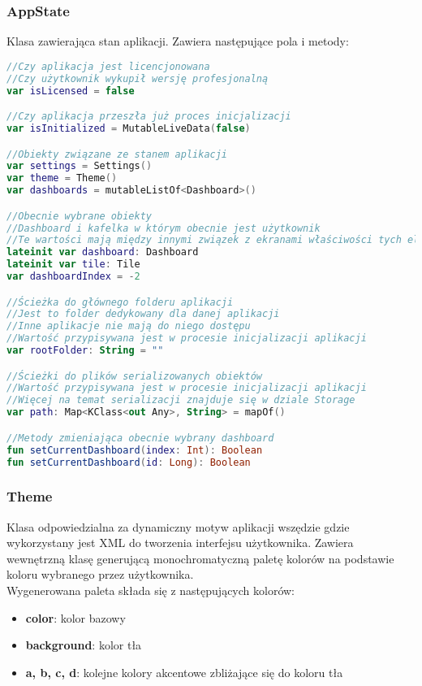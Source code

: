 \newpage

\subsubsection{AppState}
Klasa zawierająca stan aplikacji. Zawiera następujące pola i metody:

\begin{lstlisting}[language=Kotlin]
//Czy aplikacja jest licencjonowana
//Czy użytkownik wykupił wersję profesjonalną
var isLicensed = false

//Czy aplikacja przeszła już proces inicjalizacji
var isInitialized = MutableLiveData(false)

//Obiekty związane ze stanem aplikacji
var settings = Settings()
var theme = Theme()
var dashboards = mutableListOf<Dashboard>()

//Obecnie wybrane obiekty
//Dashboard i kafelka w którym obecnie jest użytkownik
//Te wartości mają między innymi związek z ekranami właściwości tych elementów
lateinit var dashboard: Dashboard
lateinit var tile: Tile
var dashboardIndex = -2

//Ścieżka do głównego folderu aplikacji
//Jest to folder dedykowany dla danej aplikacji
//Inne aplikacje nie mają do niego dostępu
//Wartość przypisywana jest w procesie inicjalizacji aplikacji
var rootFolder: String = ""

//Ścieżki do plików serializowanych obiektów
//Wartość przypisywana jest w procesie inicjalizacji aplikacji
//Więcej na temat serializacji znajduje się w dziale Storage
var path: Map<KClass<out Any>, String> = mapOf()

//Metody zmieniająca obecnie wybrany dashboard
fun setCurrentDashboard(index: Int): Boolean
fun setCurrentDashboard(id: Long): Boolean
\end{lstlisting}

\newpage

\subsubsection{Theme}
Klasa odpowiedzialna za dynamiczny motyw aplikacji wszędzie gdzie wykorzystany jest XML do tworzenia interfejsu użytkownika. Zawiera wewnętrzną klasę  generującą monochromatyczną paletę kolorów na podstawie koloru wybranego przez użytkownika.\\

Wygenerowana paleta składa się z następujących kolorów:
\begin{itemize}[leftmargin=*]
  \item \textbf{color}: kolor bazowy
  \item \textbf{background}: kolor tła
  \item \textbf{a, b, c, d}: kolejne kolory akcentowe zbliżające się do koloru tła
\end{itemize}

